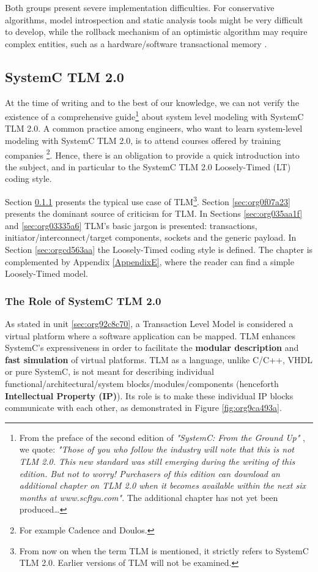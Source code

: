 \documentclass[11pt]{article}
\begin{document}
Both groups present severe implementation difficulties.
For conservative algorithms, model introspection and static analysis tools might be very difficult to develop,
while the rollback mechanism of an optimistic algorithm may require complex entities, such as a hardware/software transactional memory \cite{Anane2015} .

\clearpage

\subsection{SystemC TLM 2.0}
\label{sec:org9e51265}
At the time of writing and to the best of our knowledge, we can not verify the existence of a comprehensive guide\footnote{From the preface of the second edition of \textit{"SystemC: From the Ground Up"} \cite{Black2010}, we quote: 
\textit{"Those of you who follow the industry will note that this is not TLM 2.0. This new standard was still emerging during the writing of this edition. But not to worry! Purchasers of this edition can download an additional chapter on TLM 2.0 when it becomes available within the next six months at www.scftgu.com"}.
The additional chapter has not yet been produced\ldots{}} about system level modeling with SystemC TLM 2.0.
A common practice among engineers, who want to learn system-level modeling with SystemC TLM 2.0, is to attend courses offered by training companies \footnote{For example Cadence and Doulos.}.
Hence, there is an obligation to provide a quick introduction into the subject, and in particular to the SystemC TLM 2.0 Loosely-Timed (LT) coding style.

Section \ref{sec:org6d5daeb} presents the typical use case of TLM\footnote{From now on when the term TLM is mentioned, it strictly refers to SystemC TLM 2.0. 
Earlier versions of TLM will not be examined.}.
Section \ref{sec:org0f07a23} presents the dominant source of criticism for TLM.
In Sections \ref{sec:org035aa1f} and \ref{sec:org03335a6} TLM's basic jargon is presented: transactions, initiator/interconnect/target components, sockets and the generic payload.
In Section \ref{sec:orgcd563aa} the Loosely-Timed coding style is defined.
The chapter is complemented by Appendix \ref{AppendixE}, where the reader can find a simple Loosely-Timed model.

\subsubsection{The Role of SystemC TLM 2.0}
\label{sec:org6d5daeb}
As stated in unit \ref{sec:org92c8c70}, a Transaction Level Model is considered a virtual platform where a software application can be mapped.
TLM enhances SystemC's expressiveness in order to facilitate the \textbf{modular description} and \textbf{fast simulation} of virtual platforms.
TLM as a language, unlike C/C++, VHDL or pure SystemC, is not meant for describing individual functional/architectural/system blocks/modules/components (henceforth \textbf{Intellectual Property (IP)}).
Its role is to make these individual IP blocks communicate with each other, as demonstrated in Figure \ref{fig:org9ca493a}.
\end{document}
